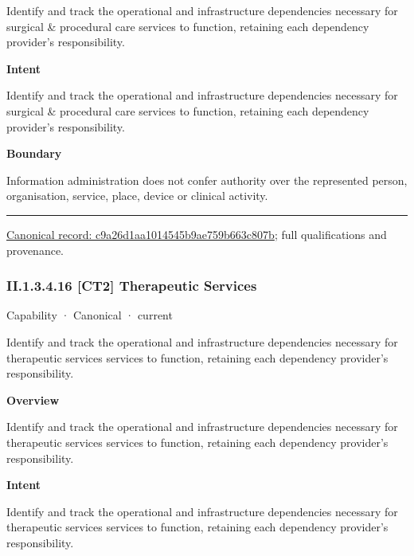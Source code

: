 Identify and track the operational and infrastructure dependencies necessary for surgical \& procedural care services to function, retaining each dependency provider's responsibility.



\textbf{Intent}



Identify and track the operational and infrastructure dependencies necessary for surgical \& procedural care services to function, retaining each dependency provider's responsibility.



\textbf{Boundary}



Information administration does not confer authority over the represented person, organisation, service, place, device or clinical activity.



\medskip\hrule\medskip

{\footnotesize \href{../../../../continuum/strategy/capability/c9a26d1aa1014545b9ae759b663c807b.md}{Canonical record: c9a26d1aa1014545b9ae759b663c807b}; full qualifications and provenance.}\par
\subsubsection*{II.1.3.4.16 [CT2] Therapeutic Services}
\label{navigation:II.1.3.4.16}

\label{element:b512b6d326004cb7b91a627fe6dbd8be}
{\small Capability · Canonical · current}\par

Identify and track the operational and infrastructure dependencies necessary for therapeutic services services to function, retaining each dependency provider's responsibility.



\textbf{Overview}



Identify and track the operational and infrastructure dependencies necessary for therapeutic services services to function, retaining each dependency provider's responsibility.



\textbf{Intent}



Identify and track the operational and infrastructure dependencies necessary for therapeutic services services to function, retaining each dependency provider's responsibility.



